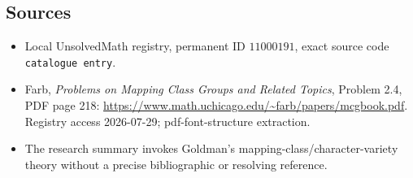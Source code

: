 \documentclass[11pt]{article}
\begin{document}
\subsection{Sources}
\begin{itemize}
\item Local UnsolvedMath registry, permanent ID \(11000191\), exact source code \texttt{catalogue entry}.
\item Farb, \emph{Problems on Mapping Class Groups and Related Topics}, Problem 2.4, PDF page 218: \url{https://www.math.uchicago.edu/~farb/papers/mcgbook.pdf}. Registry access 2026-07-29; pdf-font-structure extraction.
\item The research summary invokes Goldman's mapping-class/character-variety theory without a precise bibliographic or resolving reference.
\end{itemize}
\end{document}
